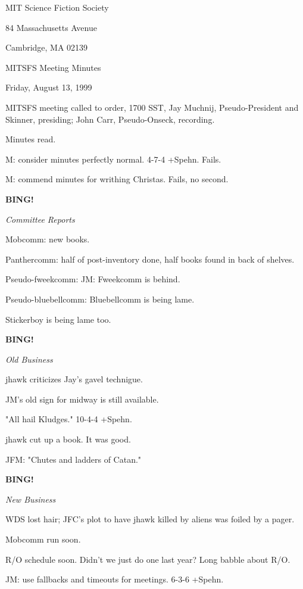 \documentclass[12pt]{article}
\newcommand{\bing}{{\bf BING!} }
\newcommand{\goto}[1]{\bing \vskip 12pt \centerline{{\em{#1}}}}
\begin{document}
\begin{center}

MIT Science Fiction Society 

84 Massachusetts Avenue

Cambridge, MA 02139

\vspace{12pt}

MITSFS Meeting Minutes 

Friday, August 13, 1999

\end{center}
 
\vspace{18pt}

\setlength{\parskip}{6pt}

\noindent
MITSFS meeting called to order, 1700 SST,
Jay Muchnij, Pseudo-President and Skinner, presiding; John Carr, Pseudo-Onseck, recording.

Minutes read.

M: consider minutes perfectly normal. 4-7-4 +Spehn. Fails.

M: commend minutes for writhing Christas. Fails, no second.

\goto{Committee Reports}

Mobcomm: new books.

Panthercomm: half of post-inventory done, half books found in back of shelves.

Pseudo-fweekcomm: JM: Fweekcomm is behind.

Pseudo-bluebellcomm: Bluebellcomm is being lame.

Stickerboy is being lame too.

\goto{Old Business}

jhawk criticizes Jay's gavel technigue.

JM's old sign for midway is still available.

"All hail Kludges." 10-4-4 +Spehn.

jhawk cut up a book. It was good.

JFM: "Chutes and ladders of Catan."

\goto{New Business}

WDS lost hair; JFC's plot to have jhawk killed by aliens was foiled by a pager.

Mobcomm run soon.

R/O schedule soon. Didn't we just do one last year? Long babble about R/O.

JM: use fallbacks and timeouts for meetings. 6-3-6 +Spehn.
\end{document}

